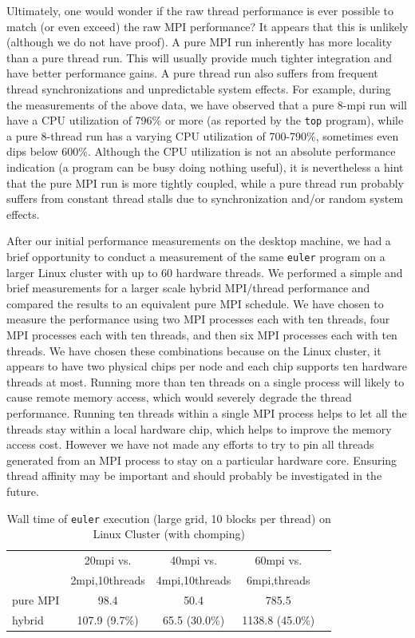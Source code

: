 \documentclass{article}
\begin{document}
Ultimately, one would wonder if the raw thread performance is ever
possible to match (or even exceed) the raw MPI performance?  It appears
that this is unlikely (although we do not have proof).  A pure MPI run
inherently has more locality than a pure thread run.  This will usually
provide much tighter integration and have better performance gains.  A
pure thread run also suffers from frequent thread synchronizations and
unpredictable system effects.  For example, during the measurements of
the above data, we have observed that a pure 8-mpi run will have a CPU
utilization of 796\% or more (as reported by the \texttt{top} program),
while a pure 8-thread run has a varying CPU utilization of 700-790\%,
sometimes even dips below 600\%.  Although the CPU utilization is not an
absolute performance indication (a program can be busy doing nothing
useful), it is nevertheless a hint that the pure MPI run is more tightly
coupled, while a pure thread run probably suffers from constant thread
stalls due to synchronization and/or random system effects.

After our initial performance measurements on the desktop machine, we
had a brief opportunity to conduct a measurement of the same
\texttt{euler} program on a larger Linux cluster with up to 60 hardware
threads.  We performed a simple and brief measurements for a larger
scale hybrid MPI/thread performance and compared the results to an
equivalent pure MPI schedule.  We have chosen to measure the performance
using two MPI processes each with ten threads, four MPI processes each with
ten threads, and then six MPI processes each with ten threads.  We have
chosen these combinations because on the Linux cluster, it appears to
have two physical chips per node and each chip supports ten hardware
threads at most.  Running more than ten threads on a single process will
likely to cause remote memory access, which would severely degrade the
thread performance.  Running ten threads within a single MPI process
helps to let all the threads stay within a local hardware chip, which
helps to improve the memory access cost.  However we have not made any
efforts to try to pin all threads generated from an MPI process to stay
on a particular hardware core.  Ensuring thread affinity may be
important and should probably be investigated in the future.

\begin{table}[h]
  \begin{center}
    \caption{Wall time of \texttt{euler} execution (large grid, 10 blocks per thread) on Linux Cluster (with chomping)\label{tab:euler-wall-cluster}}
    \begin{tabular}{|l|c|c|c|c|}
      \hline
      & 20mpi vs. & 40mpi vs. & 60mpi vs. \\
      & 2mpi,10threads & 4mpi,10threads & 6mpi,threads \\
      \hline
      pure MPI & 98.4 & 50.4 & 785.5 \\ 
      hybrid & 107.9 (9.7\%) & 65.5 (30.0\%) & 1138.8 (45.0\%) \\
      \hline
    \end{tabular}
  \end{center}
\end{table}
\end{document}
